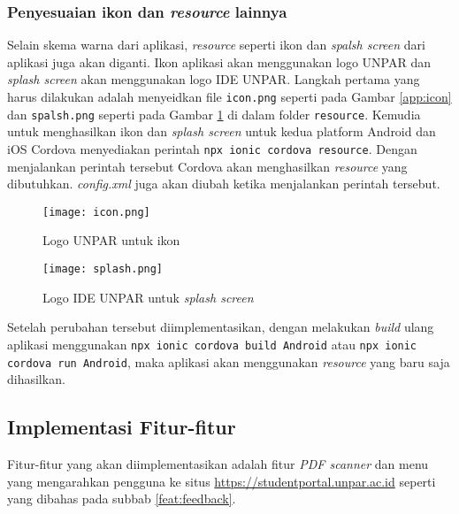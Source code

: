 \subsubsection{Penyesuaian ikon dan \textit{resource} lainnya}
Selain skema warna dari aplikasi, \textit{resource} seperti ikon dan \textit{spalsh screen} dari aplikasi juga akan diganti. Ikon aplikasi akan menggunakan logo UNPAR dan \textit{splash screen} akan menggunakan logo IDE UNPAR. Langkah pertama yang harus dilakukan adalah menyeidkan file \texttt{icon.png} seperti pada Gambar \ref{app:icon} dan \texttt{spalsh.png} seperti pada Gambar \ref{app:splash} di dalam folder \texttt{resource}. Kemudia untuk menghasilkan ikon dan \textit{splash screen} untuk kedua platform Android dan iOS Cordova menyediakan perintah \texttt{npx ionic cordova resource}. Dengan menjalankan perintah tersebut Cordova akan menghasilkan \textit{resource} yang dibutuhkan. \textit{config.xml} juga akan diubah ketika menjalankan perintah tersebut.

\begin{figure}[H] 
\begin{minipage}{.5\textwidth}
	\centering  
	\texttt{[image: icon.png]}  
	\caption[Logo  UNPAR] {Logo  UNPAR untuk ikon} 
	\label{app:icon}
\end{minipage}
\begin{minipage}{.5\textwidth}
	\centering 
	\texttt{[image: splash.png]}
	\caption[Logo IDE UNPAR untuk \textit{splash screen}] {Logo IDE UNPAR untuk \textit{splash screen}} 
	\label{app:splash} 
\end{minipage}
\end{figure} 




Setelah perubahan tersebut diimplementasikan, dengan melakukan \textit{build} ulang aplikasi menggunakan \texttt{npx ionic cordova build Android} atau \texttt{npx ionic cordova run Android}, maka aplikasi akan menggunakan \textit{resource} yang baru saja dihasilkan.

\subsection{Implementasi Fitur-fitur}
Fitur-fitur yang akan diimplementasikan adalah fitur \textit{PDF scanner} dan menu yang mengarahkan pengguna ke situs \url{https://studentportal.unpar.ac.id} seperti yang dibahas pada subbab \ref{feat:feedback}.%

